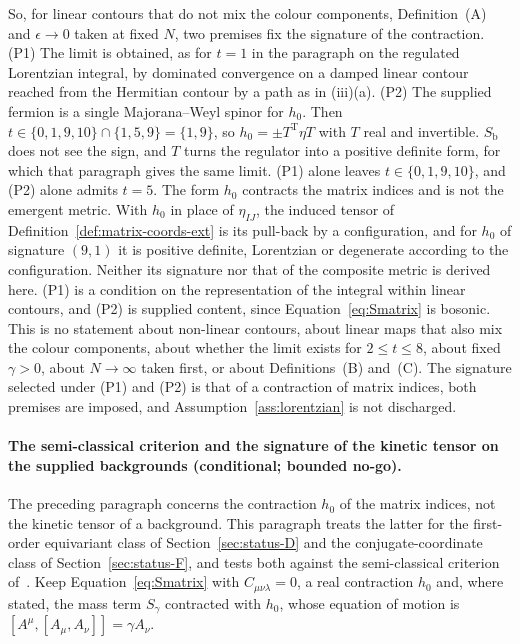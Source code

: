 So, for linear contours that do not mix the colour components, Definition~(A) and \(\epsilon\to0\) taken at fixed \(N\), two premises fix the signature of the contraction. (P1) The limit is obtained, as for \(t=1\) in the paragraph on the regulated Lorentzian integral, by dominated convergence on a damped linear contour reached from the Hermitian contour by a path as in (iii)(a). (P2) The supplied fermion is a single Majorana--Weyl spinor for \(h_0\). Then \(t\in\{0,1,9,10\}\cap\{1,5,9\}=\{1,9\}\), so \(h_0=\pm T^{\mathrm T}\eta T\) with \(T\) real and invertible. \(S_{\mathrm b}\) does not see the sign, and \(T\) turns the regulator into a positive definite form, for which that paragraph gives the same limit. (P1) alone leaves \(t\in\{0,1,9,10\}\), and (P2) alone admits \(t=5\). The form \(h_0\) contracts the matrix indices and is not the emergent metric. With \(h_0\) in place of \(\eta_{IJ}\), the induced tensor of Definition~\ref{def:matrix-coords-ext} is its pull-back by a configuration, and for \(h_0\) of signature \((9,1)\) it is positive definite, Lorentzian or degenerate according to the configuration. Neither its signature nor that of the composite metric is derived here. (P1) is a condition on the representation of the integral within linear contours, and (P2) is supplied content, since Equation~\eqref{eq:Smatrix} is bosonic. This is no statement about non-linear contours, about linear maps that also mix the colour components, about whether the limit exists for \(2\le t\le8\), about fixed \(\gamma>0\), about \(N\to\infty\) taken first, or about Definitions~(B) and~(C). The signature selected under (P1) and (P2) is that of a contraction of matrix indices, both premises are imposed, and Assumption~\ref{ass:lorentzian} is not discharged.

\paragraph{The semi-classical criterion and the signature of the kinetic tensor on the supplied backgrounds (conditional; bounded no-go).}
The preceding paragraph concerns the contraction \(h_0\) of the matrix indices, not the kinetic tensor of a background. This paragraph treats the latter for the first-order equivariant class of Section~\ref{sec:status-D} and the conjugate-coordinate class of Section~\ref{sec:status-F}, and tests both against the semi-classical criterion of~\cite{Steinacker2026Weak}. Keep Equation~\eqref{eq:Smatrix} with \(C_{\mu\nu\lambda}=0\), a real contraction \(h_0\) and, where stated, the mass term \(S_\gamma\) contracted with \(h_0\), whose equation of motion is \([A^\mu,[A_\mu,A_\nu]]=\gamma A_\nu\).

